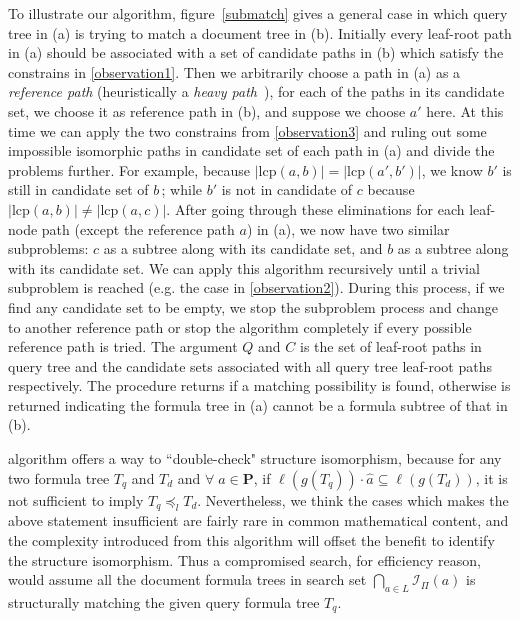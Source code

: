 \documentclass{acm_proc_article-sp}
\begin{document}
To illustrate our  algorithm, figure~\ref{submatch} gives a general case in which query tree in (a) is trying to match a document tree in (b).
Initially every leaf-root path in (a) should be associated with a set of candidate paths in (b) which satisfy the constrains in \ref{observation1}.
Then we arbitrarily choose a path in (a) as a \textit{reference path} (heuristically a \textit{heavy path}~\cite{heavypathde}), for each of the paths in its candidate set, we choose it as reference path in (b), and suppose we choose $a'$ here. At this time we can apply the two constrains from \ref{observation3} and ruling out some impossible isomorphic paths in candidate set of each path in (a) and divide the problems further. 
For example, because $\left| \mathrm{lcp}(a,b) \right| = \left| \mathrm{lcp}(a',b') \right|$, we know $b'$ is still in candidate set of $b\,$; while $b'$ is not in candidate of $c$ because $\left| \mathrm{lcp}(a,b) \right| \neq \left| \mathrm{lcp}(a,c) \right|$. 
After going through these eliminations for each leaf-node path (except the reference path $a$) in (a), we now have two similar subproblems: $c$ as a subtree along with its candidate set, and $b$ as a subtree along with its candidate set. 
We can apply this algorithm recursively until a trivial subproblem is reached (e.g. the case in \ref{observation2}). During this process, if we find any candidate set to be empty, we stop the subproblem process and change to another reference path or stop the algorithm completely if every possible reference path is tried.
The argument $Q$ and $C$ is the set of leaf-root paths in query tree and the candidate sets associated with all query tree leaf-root paths respectively.
The procedure returns  if a matching possibility is found, otherwise  is returned indicating the formula tree in (a) cannot be a formula subtree of that in (b).

 algorithm offers a way to ``double-check" structure isomorphism, because 
for any two formula tree $T_q$ and $T_d$ and $\forall\; \hat{a} \in \mathbf{P}$, if $\ell(g(T_q)) \cdot \hat{a} \subseteq \ell(g(T_d))$, it is not sufficient to imply $T_q \preceq_l T_d$.
Nevertheless, we think the cases which makes the above statement insufficient are fairly rare in common mathematical content, and the complexity introduced from this algorithm will offset the benefit to identify the structure isomorphism.
Thus a compromised search, for efficiency reason, would assume all the document formula trees in search set
$\bigcap_{a \in L} \mathcal{I}_{\Pi}(a)$ is structurally matching the given query formula tree $T_q$.
\end{document}
